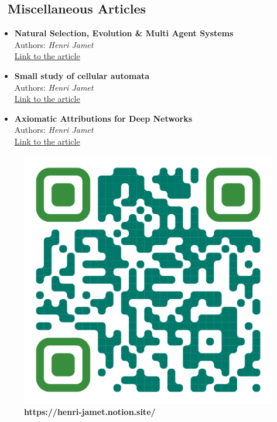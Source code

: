 \subsection{\articlesdiversicon~\textcolor{Overleaf_green}{Miscellaneous Articles}}
\begin{itemize}
  \item \textbf{Natural Selection, Evolution \& Multi Agent Systems}\\
  Authors: \textit{Henri Jamet}\\
  \href{https://henri-jamet.notion.site/tude-de-la-S-lection-naturelle-au-moyen-d-une-simulation-multi-agents-88f57904e2a94503a0d91bb99f7d1941}{Link to the article}
  
  \item \textbf{Small study of cellular automata}\\
  Authors: \textit{Henri Jamet}\\
  \href{https://henri-jamet.notion.site/Small-study-of-cellular-automata-352e858c867e4cf3a960651f33738cb5}{Link to the article}
  
  \item \textbf{Axiomatic Attributions for Deep Networks}\\
  Authors: \textit{Henri Jamet}\\
  \href{https://henri-jamet.notion.site/Attributions-Axiomatiques-pour-les-R-seaux-Profonds-146fdf9f541b48738a7c60a2ad669ed8?pvs=4}{Link to the article}
\end{itemize}

\begin{figure}[h]
  \centering
  \begin{adjustbox}{max width=0.2\textwidth}
    \includegraphics{Img/QR.png}
  \end{adjustbox}
  \caption{\textbf{https://henri-jamet.notion.site/}}
\end{figure}